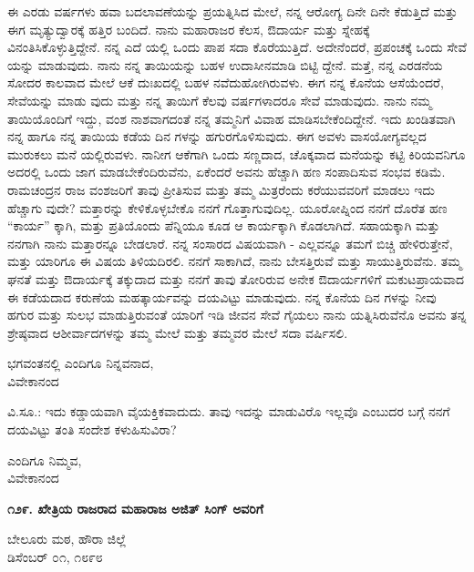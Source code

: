ಈ ಎರಡು ವರ್ಷಗಳು ಹವಾ ಬದಲಾವಣೆಯನ್ನು ಪ್ರಯತ್ನಿಸಿದ ಮೇಲೆ, ನನ್ನ ಆರೋಗ್ಯ ದಿನೇ ದಿನೇ ಕೆಡುತ್ತಿದೆ ಮತ್ತು ಈಗ ಮೃತ್ಯುದ್ವಾರಕ್ಕೆ ಹತ್ತಿರ ಬಂದಿದೆ. ನಾನು ಮಹಾರಾಜರ ಕೆಲಸ, ಔದಾರ್ಯ ಮತ್ತು ಸ್ನೇಹಕ್ಕೆ ವಿನಂತಿಸಿಕೊಳ್ಳುತ್ತಿದ್ದೇನೆ. ನನ್ನ ಎದೆ ಯಲ್ಲಿ ಒಂದು ಪಾಪ ಸದಾ ಕೊರೆಯುತ್ತಿದೆ. ಅದೇನೆಂದರೆ, ಪ್ರಪಂಚಕ್ಕೆ ಒಂದು ಸೇವೆ ಯನ್ನು ಮಾಡುವುದು. ನಾನು ನನ್ನ ತಾಯಿಯನ್ನು ಬಹಳ ಉದಾಸೀನಮಾಡಿ ಬಿಟ್ಟಿ ದ್ದೇನೆ. ಮತ್ತೆ, ನನ್ನ ಎರಡನೆಯ ಸೋದರ ಕಾಲವಾದ ಮೇಲೆ ಆಕೆ ದುಃಖದಲ್ಲಿ ಬಹಳ ನವೆದುಹೋಗಿರುವಳು. ಈಗ ನನ್ನ ಕೊನೆಯ ಆಸೆಯೆಂದರೆ, ಸೇವೆಯನ್ನು ಮಾಡು ವುದು ಮತ್ತು ನನ್ನ ತಾಯಿಗೆ ಕೆಲವು ವರ್ಷಗಳಾದರೂ ಸೇವೆ ಮಾಡುವುದು. ನಾನು ನಮ್ಮ ತಾಯಿಯೊಂದಿಗೆ ಇದ್ದು, ವಂಶ ನಾಶವಾಗದಂತೆ ನನ್ನ ತಮ್ಮನಿಗೆ ವಿವಾಹ ಮಾಡಿಸಬೇಕೆಂದಿದ್ದೇನೆ. ಇದು ಖಂಡಿತವಾಗಿ ನನ್ನ ಹಾಗೂ ನನ್ನ ತಾಯಿಯ ಕಡೆಯ ದಿನ ಗಳನ್ನು ಹಗುರಗೊಳಿಸುವುದು. ಈಗ ಅವಳು ವಾಸಯೋಗ್ಯವಲ್ಲದ ಮುರುಕಲು ಮನೆ ಯಲ್ಲಿರುವಳು. ನಾನೀಗ ಆಕೆಗಾಗಿ ಒಂದು ಸಣ್ಣದಾದ, ಚೊಕ್ಕವಾದ ಮನೆಯನ್ನು ಕಟ್ಟಿ ಕಿರಿಯವನಿಗೂ ಅದರಲ್ಲಿ ಒಂದು ಜಾಗ ಮಾಡಬೇಕೆಂದಿರುವೆನು, ಏಕೆಂದರೆ ಅವನು ಹೆಚ್ಚಾಗಿ ಹಣ ಸಂಪಾದಿಸುವ ಸಂಭವ ಕಡಿಮೆ. ರಾಮಚಂದ್ರನ ರಾಜ ವಂಶಜರಿಗೆ ತಾವು ಪ್ರೀತಿಸುವ ಮತ್ತು ತಮ್ಮ ಮಿತ್ರರೆಂದು ಕರೆಯುವವರಿಗೆ ಮಾಡಲು ಇದು ಹೆಚ್ಚಾಗು ವುದೇ? ಮತ್ತಾರನ್ನು ಕೇಳಿಕೊಳ್ಳಬೇಕೊ ನನಗೆ ಗೊತ್ತಾಗುವುದಿಲ್ಲ. ಯೂರೋಪ್ನಿಂದ ನನಗೆ ದೊರೆತ ಹಣ “ಕಾರ್ಯ” ಕ್ಕಾಗಿ, ಮತ್ತು ಪ್ರತಿಯೊಂದು ಪೆನ್ನಿಯೂ ಕೂಡ ಆ ಕಾರ್ಯಕ್ಕಾಗಿ ಕೊಡಲಾಗಿದೆ. ಸಹಾಯಕ್ಕಾಗಿ ಮತ್ತು ನನಗಾಗಿ ನಾನು ಮತ್ತಾರನ್ನೂ ಬೇಡಲಾರೆ. ನನ್ನ ಸಂಸಾರದ ವಿಷಯವಾಗಿ - ಎಲ್ಲವನ್ನೂ ತಮಗೆ ಬಿಚ್ಚಿ ಹೇಳಿರುತ್ತೇನೆ, ಮತ್ತು ಯಾರಿಗೂ ಈ ವಿಷಯ ತಿಳಿಯದಿರಲಿ. ನನಗೆ ಸಾಕಾಗಿದೆ, ನಾನು ಬೇಸತ್ತಿರುವೆ ಮತ್ತು ಸಾಯುತ್ತಿರುವೆನು. ತಮ್ಮ ಘನತೆ ಮತ್ತು ಔದಾರ್ಯಕ್ಕೆ ತಕ್ಕುದಾದ ಮತ್ತು ನನಗೆ ತಾವು ತೋರಿರುವ ಅನೇಕ ಔದಾರ್ಯಗಳಿಗೆ ಮಕುಟಪ್ರಾಯವಾದ ಈ ಕಡೆಯದಾದ ಕರುಣೆಯ ಮಹತ್ಕಾರ್ಯವನ್ನು ದಯವಿಟ್ಟು ಮಾಡುವುದು. ನನ್ನ ಕೊನೆಯ ದಿನ ಗಳನ್ನು ನೀವು ಹಗುರ ಮತ್ತು ಸುಲಭ ಮಾಡುತ್ತಿರುವಂತೆ ಯಾರಿಗೆ ಇಡಿ ಜೀವನ ಸೇವೆ ಗೈಯಲು ನಾನು ಯತ್ನಿಸಿರುವೆನೊ ಅವನು ತನ್ನ ಶ್ರೇಷ್ಠವಾದ ಆಶೀರ್ವಾದಗಳನ್ನು ತಮ್ಮ ಮೇಲೆ ಮತ್ತು ತಮ್ಮವರ ಮೇಲೆ ಸದಾ ವರ್ಷಿಸಲಿ.

\begin{flushright}
ಭಗವಂತನಲ್ಲಿ ಎಂದಿಗೂ ನಿನ್ನವನಾದ,\\ವಿವೇಕಾನಂದ
\end{flushright}

ವಿ.ಸೂ.: ಇದು ಕಡ್ಡಾಯವಾಗಿ ವೈಯಕ್ತಿಕವಾದುದು. ತಾವು ಇದನ್ನು ಮಾಡುವಿರೊ ಇಲ್ಲವೊ ಎಂಬುದರ ಬಗ್ಗೆ ನನಗೆ ದಯವಿಟ್ಟು ತಂತಿ ಸಂದೇಶ ಕಳುಹಿಸುವಿರಾ?

\begin{flushright}
ಎಂದಿಗೂ ನಿಮ್ಮವ,\\ವಿವೇಕಾನಂದ
\end{flushright}

\begin{center}
\textbf{೧೨೯. ಖೇತ್ರಿಯ ರಾಜರಾದ ಮಹಾರಾಜ ಅಜಿತ್ ಸಿಂಗ್ ಅವರಿಗೆ}
\end{center}

\begin{flushright}
ಬೇಲೂರು ಮಠ, ಹೌರಾ ಜಿಲ್ಲೆ\\ಡಿಸೆಂಬರ್ ೦೧, ೧೮೯೮
\end{flushright}


